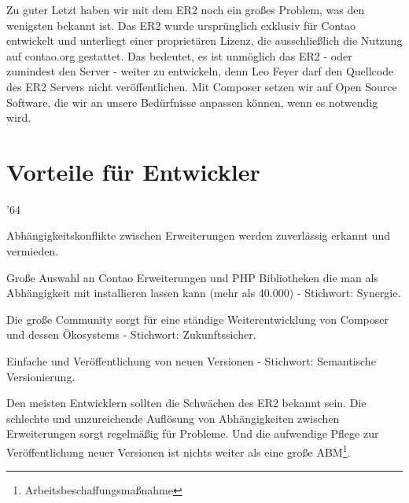 \documentclass[
paper=a4,
draft=false,%
fontsize=10pt%
]{scrartcl}
\begin{document}
Zu guter Letzt haben wir mit dem ER2 noch ein großes Problem, was den wenigsten bekannt ist. Das ER2 wurde ursprünglich exklusiv für Contao entwickelt und unterliegt einer proprietären Lizenz, die ausschließlich die Nutzung auf contao.org gestattet. Das bedeutet, es ist unmöglich das ER2 - oder zumindest den Server - weiter zu entwickeln, denn Leo Feyer darf den Quellcode des ER2 Servers nicht veröffentlichen. Mit Composer setzen wir auf Open Source Software, die wir an unsere Bedürfnisse anpassen können, wenn es notwendig wird.

\newpage

%
%

\section{Vorteile für Entwickler}
\label{sec:pros-for-developers}

\begin{minipage}{.02\linewidth}
\end{minipage}
\begin{minipage}{.98\linewidth}
  \begin{dinglist}{'64}
  \item Abhängigkeitskonflikte zwischen Erweiterungen werden zuverlässig erkannt und vermieden.
  \item Große Auswahl an Contao Erweiterungen und PHP Bibliotheken die man als Abhängigkeit mit installieren lassen kann (mehr als 40.000) - Stichwort: Synergie.
  \item Die große Community sorgt für eine ständige Weiterentwicklung von Composer und dessen Ökosystems - Stichwort: Zukunftssicher.
  \item Einfache und  Veröffentlichung von neuen Versionen - Stichwort: Semantische Versionierung.
  \end{dinglist}
\end{minipage}

Den meisten Entwicklern sollten die Schwächen des ER2 bekannt sein. Die schlechte und unzureichende Auflösung von Abhängigkeiten zwischen Erweiterungen sorgt regelmäßig für Probleme. Und die aufwendige Pflege zur Veröffentlichung neuer Versionen ist nichts weiter als eine große ABM\footnote{Arbeitsbeschaffungsmaßnahme}.
\end{document}

